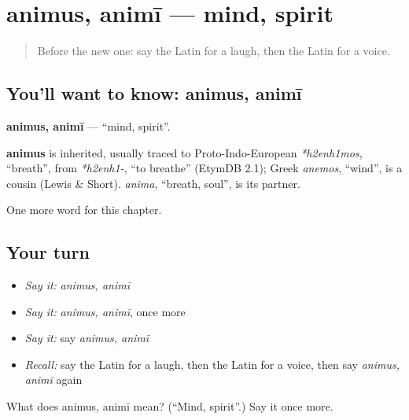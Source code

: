 \section[animus, animī]{animus, animī — mind, spirit}

\label{lesson:LA-C174-animus}



\begin{quote}
Before the new one: say the Latin for a laugh, then the Latin for a voice.
\end{quote}

\subsection*{You'll want to know: animus, animī}
\textbf{animus, animī} — \textquotedblleft{}mind, spirit\textquotedblright{}.

\begin{cousinweb}
\textbf{animus} is inherited, usually traced to Proto-Indo-European \emph{*h2enh1mos}, \textquotedblleft{}breath\textquotedblright{}, from \emph{*h2enh1-}, \textquotedblleft{}to breathe\textquotedblright{} (EtymDB 2.1); Greek \emph{anemos}, \textquotedblleft{}wind\textquotedblright{}, is a cousin (Lewis \& Short). \emph{anima}, \textquotedblleft{}breath, soul\textquotedblright{}, is its partner.
\end{cousinweb}

\begin{grammarlens}[title={What you've built}]
One more word for this chapter.
\end{grammarlens}

\subsection*{Your turn}
\begin{itemize}
\raggedright
  \item \emph{Say it:} \emph{animus, animī}
  \item \emph{Say it:} \emph{animus, animī}, once more
  \item \emph{Say it:} say \emph{animus, animī}
  \item \emph{Recall:} say the Latin for a laugh, then the Latin for a voice, then say \emph{animus, animī} again
\end{itemize}

\begin{tcolorbox}[breakable,colback=teal!4,colframe=teal!35!black,title={Before you move on}]
What does animus, animī mean? (\textquotedblleft{}Mind, spirit\textquotedblright{}.) Say it once more.
\end{tcolorbox}
